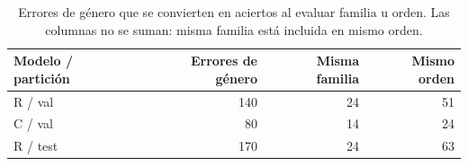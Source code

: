 \begin{table}[H]
\centering
\small
\caption{Errores de género que se convierten en aciertos al evaluar familia u orden. Las columnas no se suman: misma familia está incluida en mismo orden.}
\label{tab:error-hierarchy}
\begin{tabularx}{\linewidth}{Y r r r}
\toprule
\textbf{Modelo / partición} & \textbf{Errores de género} & \textbf{Misma familia} & \textbf{Mismo orden}\\
\midrule
R / val & 140 & 24 & 51\\
C / val & 80 & 14 & 24\\
R / test & 170 & 24 & 63\\
\bottomrule
\end{tabularx}
\end{table}
